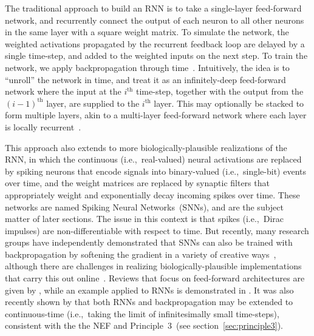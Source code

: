 The traditional approach to build an RNN is to take a single-layer feed-forward network, and recurrently connect the output of each neuron to all other neurons in the same layer with a square weight matrix.
To simulate the network, the weighted activations propagated by the recurrent feedback loop are delayed by a single time-step, and added to the weighted inputs on the next step.
To train the network, we apply backpropagation through time~\citep[BPTT;][]{werbos1990backpropagation}.
Intuitively, the idea is to ``unroll'' the network in time, and treat it as an infinitely-deep feed-forward network where the input at the $i^\text{th}$ time-step, together with the output from the $(i-1)^\text{th}$ layer, are supplied to the $i^\text{th}$ layer.
This may optionally be stacked to form multiple layers, akin to a multi-layer feed-forward network where each layer is locally recurrent~\citep{pascanu2013construct}.

This approach also extends to more biologically-plausible realizations of the RNN, in which the continuous (i.e.,~real-valued) neural activations are replaced by spiking neurons that encode signals into binary-valued (i.e.,~single-bit) events over time, and the weight matrices are replaced by synaptic filters that appropriately weight and exponentially decay incoming spikes over time.
These networks are named Spiking Neural Networks~(SNNs), and are the subject matter of later sections.
The issue in this context is that spikes (i.e.,~Dirac impulses) are non-differentiable with respect to time.
But recently, many research groups have independently demonstrated that SNNs can also be trained with backpropagation by softening the gradient in a variety of creative ways~\citep{esser2015backpropagation, hunsberger2015spiking, hunsberger2016training, lee2016training, marblestone2016toward, neftci2017neuromorphic, bellec2018long, hunsberger2018, huh2018gradient, severa2018whetstone, rasmussen2018nengodl, shrestha2018slayer, neftci2019surrogate}, although there are challenges in realizing biologically-plausible implementations that carry this out online~\citep[][submitted]{hunsberger2018, stockel2019align}.
Reviews that focus on feed-forward architectures are given by \citet{pfeiffer2018deep, tavanaei2018deep}, while an example applied to RNNs is demonstrated in \citet{diehl2016conversion}.
It was also recently shown by \citet{chen2018neural} that both RNNs and backpropagation may be extended to continuous-time (i.e.,~taking the limit of infinitesimally small time-steps), consistent with the the NEF and Principle~3~(see section~\ref{sec:principle3}).
 
